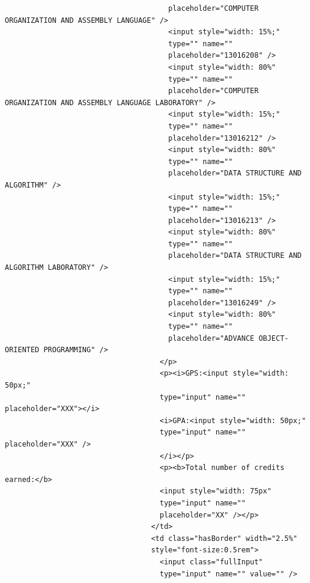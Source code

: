 \documentclass[12pt]{report} %
\begin{document}
\begin{verbatim}
                                      placeholder="COMPUTER ORGANIZATION AND ASSEMBLY LANGUAGE" />
                                      <input style="width: 15%;"
                                      type="" name=""
                                      placeholder="13016208" />
                                      <input style="width: 80%"
                                      type="" name=""
                                      placeholder="COMPUTER ORGANIZATION AND ASSEMBLY LANGUAGE LABORATORY" />
                                      <input style="width: 15%;"
                                      type="" name=""
                                      placeholder="13016212" />
                                      <input style="width: 80%"
                                      type="" name=""
                                      placeholder="DATA STRUCTURE AND ALGORITHM" />
                                      <input style="width: 15%;"
                                      type="" name=""
                                      placeholder="13016213" />
                                      <input style="width: 80%"
                                      type="" name=""
                                      placeholder="DATA STRUCTURE AND ALGORITHM LABORATORY" />
                                      <input style="width: 15%;"
                                      type="" name=""
                                      placeholder="13016249" />
                                      <input style="width: 80%"
                                      type="" name=""
                                      placeholder="ADVANCE OBJECT-ORIENTED PROGRAMMING" />
                                    </p>
                                    <p><i>GPS:<input style="width: 50px;"
                                    type="input" name="" placeholder="XXX"></i>
                                    <i>GPA:<input style="width: 50px;"
                                    type="input" name="" placeholder="XXX" />
                                    </i></p>
                                    <p><b>Total number of credits earned:</b>
                                    <input style="width: 75px"
                                    type="input" name=""
                                    placeholder="XX" /></p>
                                  </td>
                                  <td class="hasBorder" width="2.5%"
                                  style="font-size:0.5rem">
                                    <input class="fullInput"
                                    type="input" name="" value="" />

\end{verbatim}
\end{document}
